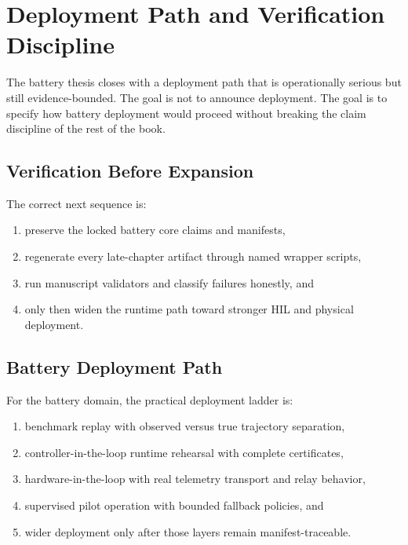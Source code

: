 \chapter{Deployment Path and Verification Discipline}
\label{ch:deployment-path-verification}

The battery thesis closes with a deployment path that is operationally
serious but still evidence-bounded.  The goal is not to announce deployment.
The goal is to specify how battery deployment would proceed without breaking
the claim discipline of the rest of the book.

\section{Verification Before Expansion}

The correct next sequence is:

\begin{enumerate}
  \item preserve the locked battery core claims and manifests,
  \item regenerate every late-chapter artifact through named wrapper scripts,
  \item run manuscript validators and classify failures honestly, and
  \item only then widen the runtime path toward stronger HIL and physical
    deployment.
\end{enumerate}

\section{Battery Deployment Path}

For the battery domain, the practical deployment ladder is:

\begin{enumerate}
  \item benchmark replay with observed versus true trajectory separation,
  \item controller-in-the-loop runtime rehearsal with complete certificates,
  \item hardware-in-the-loop with real telemetry transport and relay behavior,
  \item supervised pilot operation with bounded fallback policies, and
  \item wider deployment only after those layers remain manifest-traceable.
\end{enumerate}


